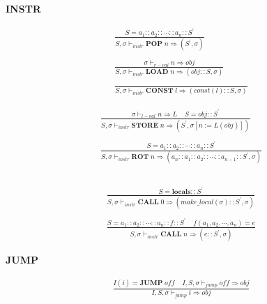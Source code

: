 \documentclass[12pt, a4paper]{report}
\newcommand{\rulegroup}[1]{
    \textbf{#1}
}
\newcommand{\gap}{ \;\;\;\; }
\begin{document}
\hrulefill

\bigbreak

\rulegroup{INSTR}

\begin{equation*}
\begin{split}
\frac{
    S = a_1 :: a_2 :: \cdots :: a_n :: S^{'}
}{
    S, \sigma \vdash_{instr} \mathbf{POP}\;n \Rightarrow (S^{'}, \sigma)
}
\\
\\
\frac{\sigma \vdash_{r-val} n \Rightarrow obj}
     {S, \sigma \vdash_{instr} \mathbf{LOAD}\; n \Rightarrow (obj :: S, \sigma)}
\\
\\
\frac{}
     {S, \sigma \vdash_{instr} \mathbf{CONST}\; l \Rightarrow (const(l) :: S, \sigma)}
\end{split}
\end{equation*}

\begin{equation*}
\begin{split}
\frac{ \sigma \vdash_{l-val} n \Rightarrow L \;\;\;\; S = obj::S^{'}}
     { S, \sigma \vdash_{instr} \mathbf{STORE} \; n \Rightarrow (S^{'}, \sigma[n := L(obj)])}
\\
\\
\frac{
    S = a_1 :: a_2 :: \cdots :: a_n :: S^{'}
}{
    S, \sigma \vdash_{instr} \mathbf{ROT}\;n 
    \Rightarrow
    (a_n :: a_1 :: a_2 :: \cdots :: a_{n - 1} :: S^{'}, \sigma)
}
\\
\\
\end{split}
\end{equation*}

\begin{equation*}
\begin{split}
\frac{
    S = \mathbf{locals} :: S^{'}
}{
    S, \sigma \vdash_{instr} \mathbf{CALL}\;0 \Rightarrow (make\_local(\sigma)::S^{'}, \sigma)
}
\\
\\
\frac{
    S = a_1 :: a_2 :: \cdots :: a_n :: f :: S^{'}
    \gap
    f(a_1, a_2, \cdots, a_n) = e
}{
    S, \sigma \vdash_{instr} \mathbf{CALL}\;n \Rightarrow (e::S^{'}, \sigma)
}
\end{split}
\end{equation*}

\hrulefill

\rulegroup{JUMP}

\begin{equation*}
\begin{split}
\frac{ I(i) = \mathbf{JUMP} \; \mathit{off} \;\;\;\; I, S, \sigma \vdash_{jump} \mathit{off} \Rightarrow obj}
     { I, S, \sigma \vdash_{jump} i \Rightarrow obj}
\end{split}
\end{equation*}
\end{document}
